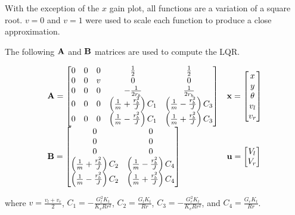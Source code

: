 With the exception of the $x$ gain plot, all functions are a variation of a
square root. $v = 0$ and $v = 1$ were used to scale each function to produce a
close approximation.

\begin{theorem}
  The following $\mathbf{A}$ and $\mathbf{B}$ matrices are used to compute the LQR.

  \begin{equation}
    \begin{array}{ll}
      \mathbf{A} =
      \begin{bmatrix}
        0 & 0 & 0 & \frac{1}{2} & \frac{1}{2} \\
        0 & 0 & v & 0 & 0 \\
        0 & 0 & 0 & -\frac{1}{2r_b} & \frac{1}{2r_b} \\
        0 & 0 & 0 & \left(\frac{1}{m} + \frac{r_b^2}{J}\right) C_1 &
          \left(\frac{1}{m} - \frac{r_b^2}{J}\right) C_3 \\
        0 & 0 & 0 & \left(\frac{1}{m} - \frac{r_b^2}{J}\right) C_1 &
          \left(\frac{1}{m} + \frac{r_b^2}{J}\right) C_3
      \end{bmatrix} &
      \mathbf{x} =
      \begin{bmatrix}
        x \\
        y \\
        \theta \\
        v_l \\
        v_r
      \end{bmatrix} \\
      \mathbf{B} =
      \begin{bmatrix}
        0 & 0 \\
        0 & 0 \\
        0 & 0 \\
        \left(\frac{1}{m} + \frac{r_b^2}{J}\right) C_2 &
        \left(\frac{1}{m} - \frac{r_b^2}{J}\right) C_4 \\
        \left(\frac{1}{m} - \frac{r_b^2}{J}\right) C_2 &
        \left(\frac{1}{m} + \frac{r_b^2}{J}\right) C_4
      \end{bmatrix} &
      \mathbf{u} =
      \begin{bmatrix}
        V_l \\
        V_r
      \end{bmatrix}
    \end{array}
  \end{equation}

  where $v = \frac{v_l + v_r}{2}$, $C_1 = -\frac{G_l^2 K_t}{K_v R r^2}$,
  $C_2 = \frac{G_l K_t}{Rr}$, $C_3 = -\frac{G_r^2 K_t}{K_v R r^2}$, and
  $C_4 = \frac{G_r K_t}{Rr}$.


\end{theorem}
